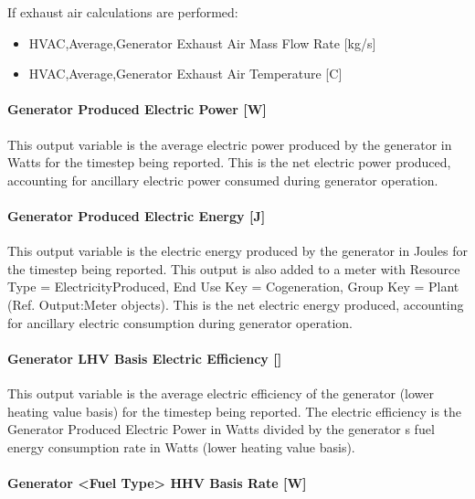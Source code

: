 If exhaust air calculations are performed:

\begin{itemize}
\item
  HVAC,Average,Generator Exhaust Air Mass Flow Rate {[}kg/s{]}
\item
  HVAC,Average,Generator Exhaust Air Temperature {[}C{]}
\end{itemize}

\paragraph{Generator Produced Electric Power {[}W{]}}\label{generator-produced-electric-power-w-1}

This output variable is the average electric power produced by the generator in Watts for the timestep being reported. This is the net electric power produced, accounting for ancillary electric power consumed during generator operation.

\paragraph{Generator Produced Electric Energy {[}J{]}}\label{generator-produced-electric-energy-j-1}

This output variable is the electric energy produced by the generator in Joules for the timestep being reported. This output is also added to a meter with Resource Type = ElectricityProduced, End Use Key = Cogeneration, Group Key = Plant (Ref. Output:Meter objects). This is the net electric energy produced, accounting for ancillary electric consumption during generator operation.

\paragraph{\texorpdfstring{Generator LHV Basis Electric Efficiency {[]}}{Generator LHV Basis Electric Efficiency }}\label{generator-lhv-basis-electric-efficiency}

This output variable is the average electric efficiency of the generator (lower heating value basis) for the timestep being reported. The electric efficiency is the Generator Produced Electric Power in Watts divided by the generator s fuel energy consumption rate in Watts (lower heating value basis).

\paragraph{Generator \textless{}Fuel Type\textgreater{} HHV Basis Rate {[}W{]}}\label{generator-fuel-type-hhv-basis-rate-w}

